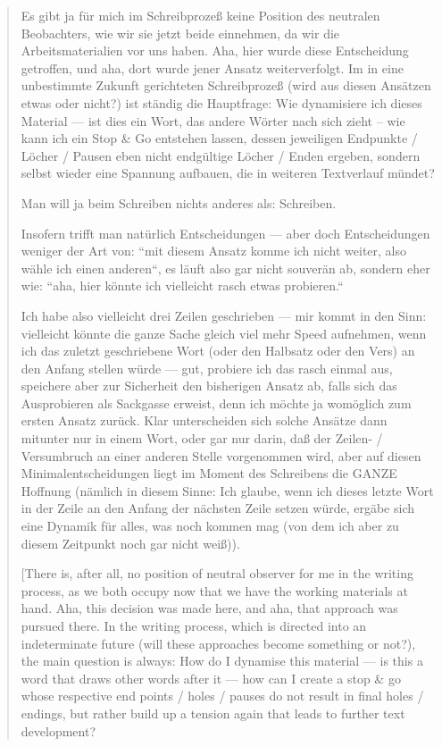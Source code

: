 \begin{paper}
\begin{quote}
Es gibt ja für mich im Schreibprozeß keine Position des neutralen
Beobachters, wie wir sie jetzt beide einnehmen, da wir die
Arbeitsmaterialien vor uns haben. Aha, hier wurde diese Entscheidung
getroffen, und aha, dort wurde jener Ansatz weiterverfolgt. Im in eine
unbestimmte Zukunft gerichteten Schreibprozeß (wird aus diesen Ansätzen
etwas oder nicht?) ist ständig die Hauptfrage: Wie dynamisiere ich
dieses Material –– ist dies ein Wort, das andere Wörter nach sich zieht
-- wie kann ich ein Stop \& Go entstehen lassen, dessen jeweiligen
Endpunkte / Löcher / Pausen eben nicht endgültige Löcher / Enden
ergeben, sondern selbst wieder eine Spannung aufbauen, die in weiteren
Textverlauf mündet?

Man will ja beim Schreiben nichts anderes als: Schreiben.

Insofern trifft man natürlich Entscheidungen –– aber doch Entscheidungen
weniger der Art von: ``mit diesem Ansatz komme ich nicht weiter, also
wähle ich einen anderen``, es läuft also gar nicht souverän ab, sondern
eher wie: ``aha, hier könnte ich vielleicht rasch etwas probieren.``

Ich habe also vielleicht drei Zeilen geschrieben –– mir kommt in den
Sinn: vielleicht könnte die ganze Sache gleich viel mehr Speed
aufnehmen, wenn ich das zuletzt geschriebene Wort (oder den Halbsatz
oder den Vers) an den Anfang stellen würde –– gut, probiere ich das
rasch einmal aus, speichere aber zur Sicherheit den bisherigen Ansatz
ab, falls sich das Ausprobieren als Sackgasse erweist, denn ich möchte
ja womöglich zum ersten Ansatz zurück. Klar unterscheiden sich solche
Ansätze dann mitunter nur in einem Wort, oder gar nur darin, daß der
Zeilen- / Versumbruch an einer anderen Stelle vorgenommen wird, aber auf
diesen Minimalentscheidungen liegt im Moment des Schreibens die GANZE
Hoffnung (nämlich in diesem Sinne: Ich glaube, wenn ich dieses letzte
Wort in der Zeile an den Anfang der nächsten Zeile setzen würde, ergäbe
sich eine Dynamik für alles, was noch kommen mag (von dem ich aber zu
diesem Zeitpunkt noch gar nicht weiß)). 

\vspace{1em}

[There is, after all, no position of neutral observer for me in the
writing process, as we both occupy now that we have the working
materials at hand. Aha, this decision was made here, and aha, that
approach was pursued there. In the writing process, which is directed
into an indeterminate future (will these approaches become something or
not?), the main question is always: How do I dynamise this material –– is
this a word that draws other words after it –– how can I create a stop \&
go whose respective end points / holes / pauses do not result in final
holes / endings, but rather build up a tension again that leads to
further text development?


\end{quote}
\end{paper}
